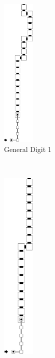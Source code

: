 \begin{itemize}
        \begin{figure}[H]
            \centering
            \begin{subfigure}[t]{0.17\textwidth}
                \centering
                \includegraphics[width=0.17\textwidth]{warping_post_warp_general_digit1}
                \caption{\label{fig:post_warp_general_digit1} General Digit 1}
            \end{subfigure}%
            ~
            \begin{subfigure}[t]{0.17\textwidth}
                \centering
                \includegraphics[width=0.17\textwidth]{warping_post_warp_general_digit2and3}

\end{subfigure}
\end{figure}
\end{itemize}
